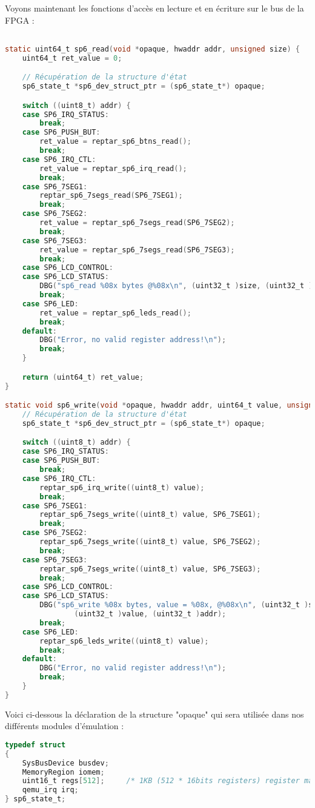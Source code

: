 Voyons maintenant les fonctions d'accès en lecture et en écriture sur le bus de la FPGA :
\begin{lstlisting}[language=C,caption=FPGA bus IO access]

static uint64_t sp6_read(void *opaque, hwaddr addr, unsigned size) {
	uint64_t ret_value = 0;

	// Récupération de la structure d'état
	sp6_state_t *sp6_dev_struct_ptr = (sp6_state_t*) opaque;

	switch ((uint8_t) addr) {
	case SP6_IRQ_STATUS:
		break;
	case SP6_PUSH_BUT:
		ret_value = reptar_sp6_btns_read();
		break;
	case SP6_IRQ_CTL:
		ret_value = reptar_sp6_irq_read();
		break;
	case SP6_7SEG1:
		reptar_sp6_7segs_read(SP6_7SEG1);
		break;
	case SP6_7SEG2:
		ret_value = reptar_sp6_7segs_read(SP6_7SEG2);
		break;
	case SP6_7SEG3:
		ret_value = reptar_sp6_7segs_read(SP6_7SEG3);
		break;
	case SP6_LCD_CONTROL:
	case SP6_LCD_STATUS:
		DBG("sp6_read %08x bytes @%08x\n", (uint32_t )size, (uint32_t )addr);
		break;
	case SP6_LED:
		ret_value = reptar_sp6_leds_read();
		break;
	default:
		DBG("Error, no valid register address!\n");
		break;
	}

	return (uint64_t) ret_value;
}

static void sp6_write(void *opaque, hwaddr addr, uint64_t value, unsigned size) {
	// Récupération de la structure d'état
	sp6_state_t *sp6_dev_struct_ptr = (sp6_state_t*) opaque;

	switch ((uint8_t) addr) {
	case SP6_IRQ_STATUS:
	case SP6_PUSH_BUT:
		break;
	case SP6_IRQ_CTL:
		reptar_sp6_irq_write((uint8_t) value);
		break;
	case SP6_7SEG1:
		reptar_sp6_7segs_write((uint8_t) value, SP6_7SEG1);
		break;
	case SP6_7SEG2:
		reptar_sp6_7segs_write((uint8_t) value, SP6_7SEG2);
		break;
	case SP6_7SEG3:
		reptar_sp6_7segs_write((uint8_t) value, SP6_7SEG3);
		break;
	case SP6_LCD_CONTROL:
	case SP6_LCD_STATUS:
		DBG("sp6_write %08x bytes, value = %08x, @%08x\n", (uint32_t )size,
				(uint32_t )value, (uint32_t )addr);
		break;
	case SP6_LED:
		reptar_sp6_leds_write((uint8_t) value);
		break;
	default:
		DBG("Error, no valid register address!\n");
		break;
	}
}
\end{lstlisting}

\pagebreak
Voici ci-dessous la déclaration de la structure "opaque" qui sera utilisée dans nos différents modules d'émulation : 
\begin{lstlisting}[language=C,caption=Opaque struct definition]
typedef struct
{
    SysBusDevice busdev;
    MemoryRegion iomem;
    uint16_t regs[512];		/* 1KB (512 * 16bits registers) register map */
    qemu_irq irq;
} sp6_state_t;
\end{lstlisting}

